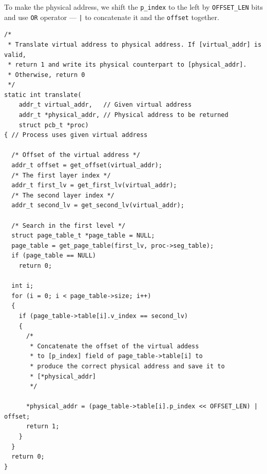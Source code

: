 \documentclass[a4paper]{article}
\numberwithin{equation}{section}
\begin{document}
To make the physical address, we shift the \texttt{p_index} to the left by \texttt{OFFSET_LEN} bits and use \texttt{OR} operator --- \texttt{|} to concatenate it and the \texttt{offset} together.
\begin{mdframed}[leftline=false,rightline=false,backgroundcolor=magenta!10,nobreak=false]
  \begin{verbatim}
/*
 * Translate virtual address to physical address. If [virtual_addr] is valid,
 * return 1 and write its physical counterpart to [physical_addr].
 * Otherwise, return 0
 */
static int translate(
    addr_t virtual_addr,   // Given virtual address
    addr_t *physical_addr, // Physical address to be returned
    struct pcb_t *proc)
{ // Process uses given virtual address

  /* Offset of the virtual address */
  addr_t offset = get_offset(virtual_addr);
  /* The first layer index */
  addr_t first_lv = get_first_lv(virtual_addr);
  /* The second layer index */
  addr_t second_lv = get_second_lv(virtual_addr);

  /* Search in the first level */
  struct page_table_t *page_table = NULL;
  page_table = get_page_table(first_lv, proc->seg_table);
  if (page_table == NULL)
    return 0;

  int i;
  for (i = 0; i < page_table->size; i++)
  {
    if (page_table->table[i].v_index == second_lv)
    {
      /*
       * Concatenate the offset of the virtual addess
       * to [p_index] field of page_table->table[i] to
       * produce the correct physical address and save it to
       * [*physical_addr]
       */

      *physical_addr = (page_table->table[i].p_index << OFFSET_LEN) | offset;
      return 1;
    }
  }
  return 0;
}
  \end{verbatim}
\end{mdframed}
\end{document}
